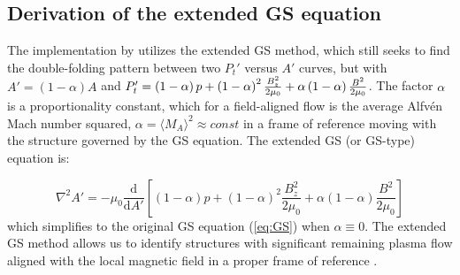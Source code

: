 \subsection{Derivation of the extended GS equation}
The implementation by \cite{Chen:2021} utilizes the extended GS method, which still seeks to find the double-folding pattern between two $P_t'$ versus $A'$ curves, but with $A'=(1-\alpha)A$ and $P_t'=\left( 1-\alpha \right)p + \left( 1-\alpha \right)^2\frac{B_z^2}{2\mu_0} + \alpha\left( 1-\alpha \right)\frac{B^2}{2\mu_0}$.  The factor $\alpha$ is a proportionality constant, which for a field-aligned flow is the average Alfv\'en Mach number squared, $\alpha=\langle M_A\rangle^2 \approx const$ in a frame of reference moving with the structure governed by the GS equation. The extended GS (or GS-type) equation \citep{Teh:2018, Sonnerup:2006} is:

\begin{equation}
    \nabla^2 A' = -\mu_0\frac{\mathrm{d}}{\mathrm{d}A'}\left[\left(1-\alpha\right)p + \left(1-\alpha\right)^2\frac{B_z^2}{2\mu_0} + \alpha\left(1-\alpha\right)\frac{B^2}{2\mu_0} \right]
    \label{eq:GSextended}
\end{equation}
which simplifies to the original GS equation (\ref{eq:GS}) when $\alpha\equiv 0$. The extended GS method allows us to identify structures with significant remaining plasma flow aligned with the local magnetic field in a proper frame of reference \citep{Chen:2022}.

